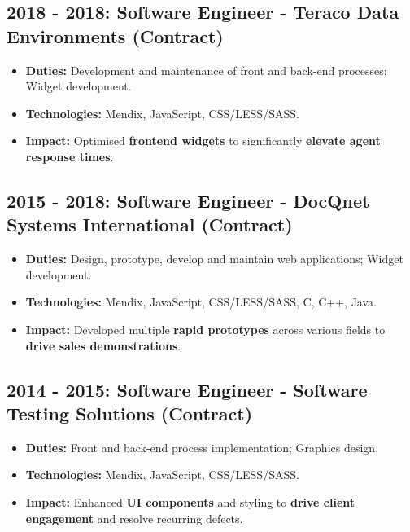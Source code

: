 \documentclass[a4paper,10pt]{article}
\begin{document}
\subsection{2018 - 2018: Software Engineer - Teraco Data Environments (Contract)}
\begin{itemize}[leftmargin=*, noitemsep]
    \item \textbf{Duties:} Development and maintenance of front and back-end processes; Widget development.
    \item \textbf{Technologies:} Mendix, JavaScript, CSS/LESS/SASS.
    \item \textbf{Impact:} Optimised \textbf{frontend widgets} to significantly \textbf{elevate agent response times}.
\end{itemize}

\subsection{2015 - 2018: Software Engineer - DocQnet Systems International (Contract)}
\begin{itemize}[leftmargin=*, noitemsep]
    \item \textbf{Duties:} Design, prototype, develop and maintain web applications; Widget development.
    \item \textbf{Technologies:} Mendix, JavaScript, CSS/LESS/SASS, C, C++, Java.
    \item \textbf{Impact:} Developed multiple \textbf{rapid prototypes} across various fields to \textbf{drive sales demonstrations}.
\end{itemize}

\subsection{2014 - 2015: Software Engineer - Software Testing Solutions (Contract)}
\begin{itemize}[leftmargin=*, noitemsep]
    \item \textbf{Duties:} Front and back-end process implementation; Graphics design.
    \item \textbf{Technologies:} Mendix, JavaScript, CSS/LESS/SASS.
    \item \textbf{Impact:} Enhanced \textbf{UI components} and styling to \textbf{drive client engagement} and resolve recurring defects.
\end{itemize}

\end{document}
